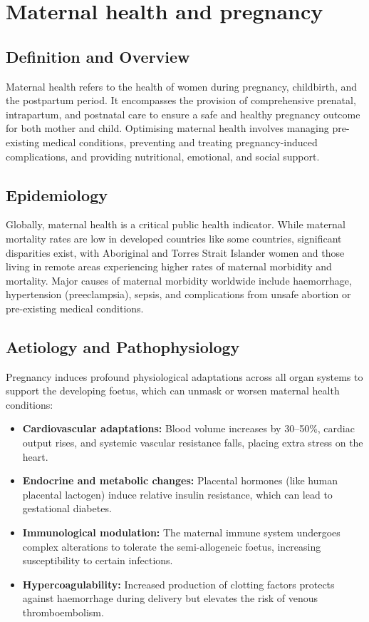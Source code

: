 \chapter{Maternal health and pregnancy}

\section*{Definition and Overview}
Maternal health refers to the health of women during pregnancy, childbirth, and the postpartum period. It encompasses the provision of comprehensive prenatal, intrapartum, and postnatal care to ensure a safe and healthy pregnancy outcome for both mother and child. Optimising maternal health involves managing pre-existing medical conditions, preventing and treating pregnancy-induced complications, and providing nutritional, emotional, and social support.

\section*{Epidemiology}
Globally, maternal health is a critical public health indicator. While maternal mortality rates are low in developed countries like some countries, significant disparities exist, with Aboriginal and Torres Strait Islander women and those living in remote areas experiencing higher rates of maternal morbidity and mortality. Major causes of maternal morbidity worldwide include haemorrhage, hypertension (preeclampsia), sepsis, and complications from unsafe abortion or pre-existing medical conditions.

\section*{Aetiology and Pathophysiology}
Pregnancy induces profound physiological adaptations across all organ systems to support the developing foetus, which can unmask or worsen maternal health conditions:

\begin{itemize}
    \item \textbf{Cardiovascular adaptations:} Blood volume increases by 30--50\%, cardiac output rises, and systemic vascular resistance falls, placing extra stress on the heart.
    \item \textbf{Endocrine and metabolic changes:} Placental hormones (like human placental lactogen) induce relative insulin resistance, which can lead to gestational diabetes.
    \item \textbf{Immunological modulation:} The maternal immune system undergoes complex alterations to tolerate the semi-allogeneic foetus, increasing susceptibility to certain infections.
    \item \textbf{Hypercoagulability:} Increased production of clotting factors protects against haemorrhage during delivery but elevates the risk of venous thromboembolism.
\end{itemize}

